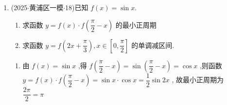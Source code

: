 \begin{enumerate}
\begin{jieda}
\begin{enumerate}
            \item 由 $f\left( \dfrac{\pi }{3}\right)  = 1$ ，得 $\dfrac{\omega \pi }{3} - \dfrac{\pi }{6} = {2k\pi }$ ，所以 $\omega  = {6k} + \dfrac{1}{2}$ ， $k \in  \mathbf{Z}$ ，令 $t = {\omega x} - \dfrac{\pi }{6}$ ,因为 $x \in  \left( {\dfrac{\pi }{6},\dfrac{\pi }{2}}\right)$ ,所以 $t \in  \left( {\dfrac{\pi }{6}\omega  - \dfrac{\pi }{6},\dfrac{\pi }{2}\omega  - }\right.  \left. \dfrac{\pi }{6}\right)$ ,又函数在 $\left( {\dfrac{\pi }{6},\dfrac{\pi }{2}}\right)$ 无最小值,所以 $\left\{  \begin{array}{l} \dfrac{\pi }{6}\omega  - \dfrac{\pi }{6} >  - \dfrac{\pi }{2} \\  \dfrac{\pi }{2}\omega  - \dfrac{\pi }{6} < \dfrac{3\pi }{2} \end{array}\right.$ ,解得 $\omega  \in  \left( {0,\dfrac{10}{3}}\right)$ ,所以 $k = 0$ ,则 $\omega  = \dfrac{1}{2}$ ,所以 $f\left( x\right)  = \cos \left( {\dfrac{1}{2}x}\right.  \left. {-\dfrac{\pi }{6}}\right)$ ,令 ${2k\pi } \leq  \dfrac{1}{2}x - \dfrac{\pi }{6} \leq  {2k\pi } + \pi$ ,所以 ${4k\pi } + \dfrac{\pi }{3} \leq  x \leq  {4k\pi }  + \dfrac{7\pi }{3},k \in  \mathbf{Z}$ ,当 $k = 0$ 时, $\dfrac{\pi }{3} \leq  x \leq  \dfrac{7\pi }{3}$ ,因为 $x \in  \left( {\dfrac{4\pi }{3},\dfrac{17\pi }{6}}\right)$ ,所以 $y = f\left( x\right)$ 在 $\left( {\dfrac{4\pi }{3},\dfrac{7\pi }{3}}\right)$ 单调递减,在 $\left( {\dfrac{7\pi }{3},\dfrac{17\pi }{6}}\right)$ 单调递增.
        \end{enumerate}
    \end{jieda}

    \item (2025$\cdot$黄浦区一模$\cdot$18)已知 $f\left( x\right)  = \sin x$.
    \begin{enumerate}
        \item 求函数 $y = f\left( x\right)  \cdot  f\left( {\dfrac{\pi }{2} - x}\right)$ 的最小正周期
        \item 求函数 $y = f\left( {{2x} + \dfrac{\pi }{3}}\right) ,x \in  \left\lbrack  {0,\dfrac{\pi }{2}}\right\rbrack$ 的单调减区间.
    \end{enumerate}
    \begin{jieda}
        \begin{enumerate}
            \item 由 $f\left( x\right)  = \sin x$ ,得 $f\left( {\dfrac{\pi }{2} - x}\right)  = \sin \left( {\dfrac{\pi }{2} - x}\right)  =  \cos x$ ,则函数 $y = f\left( x\right)  \cdot  f\left( {\dfrac{\pi }{2} - x}\right)  = \sin x \cdot  \cos x = \dfrac{1}{2}\sin {2x}$ , 故最小正周期为 $\dfrac{2\pi }{2} = \pi$
            

\end{enumerate}
\end{jieda}
\end{enumerate}
